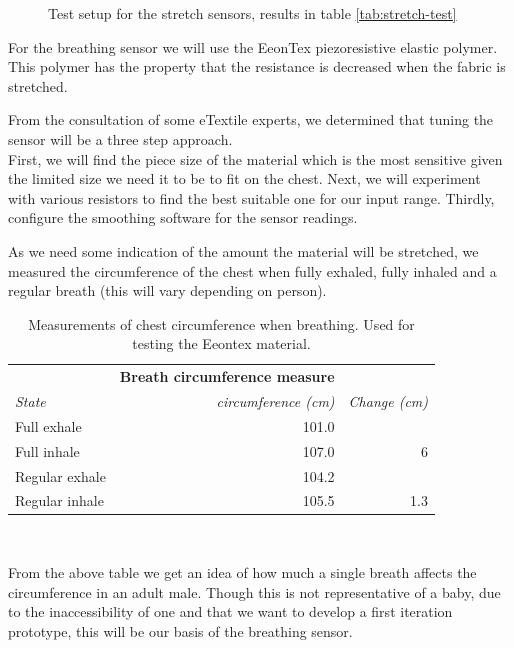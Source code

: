 \documentclass{sigchi-ext}
\begin{document}
{{\begin{minipage}{0.925\marginparwidth}
\begin{figure} [H]
    \caption{Test setup for the stretch sensors, results in table \ref{tab:stretch-test}}
\end{figure}
    \end{minipage}}\label{sec:sidebar} }

For the breathing sensor we will use the EeonTex piezoresistive elastic polymer.
This polymer has the property that the resistance is decreased when the fabric
is stretched.

From the consultation of some eTextile experts, we determined
that tuning the sensor will be a three step approach.\\
First, we will find the piece size of the material which
is the most sensitive given the limited size we need it to be
to fit on the chest. Next, we will experiment with various
resistors to find the best suitable one for our input range.
Thirdly, configure the smoothing software for the sensor readings.

As we need some indication of the amount the material will
be stretched, we measured the circumference of the chest
when fully exhaled, fully inhaled and a regular breath
(this will vary depending on person).
\begin{table}[H]
  \centering
  \begin{tabular}{l r r}
    & \multicolumn{1}{r}{\small{\textbf{Breath circumference measure}}} \\
    \cmidrule(r){2-3}
    {\small\textit{State}}
    & {\small \textit{circumference (cm)}}
    & {\small \textit{Change (cm)}}\\
    \midrule
    Full exhale    & 101.0 & \\
    Full inhale    & 107.0 & 6\\
    Regular exhale & 104.2 & \\
    Regular inhale & 105.5 & 1.3 \\
  \end{tabular}
  \caption{Measurements of chest circumference when breathing. Used for testing the Eeontex material.}~\label{tab:circumference}
\end{table}
From the above table we get an idea of how much a single breath affects the circumference
in an adult male. Though this is not representative of a baby, due to the
inaccessibility of one and that we want to develop a first iteration prototype, this
will be our basis of the breathing sensor.
\end{document}
